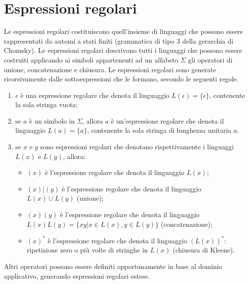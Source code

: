 \section{Espressioni regolari}
Le espressioni regolari costituiscono quell'insieme di linguaggi che possono essere rappresentati da automi a stati finiti (grammatica di tipo 3 della gerarchia di Chomsky). Le espressioni regolari descrivono tutti i linguaggi che possono essere costruiti applicando ai simboli appartenenti ad un alfabeto $\Sigma$ gli operatori di unione, concatenazione e chiusura. Le espressioni regolari sono generate ricorsivamente dalle sottoespressioni che le formano, secondo le seguenti regole.
\begin{enumerate}
\item $\epsilon$ è una espressione regolare che denota il linguaggio $L(\epsilon) = \{\epsilon\}$, 					contenente la sola stringa vuota;
\item se $a$  è un simbolo in $\Sigma$, allora $a$ è un'espressione regolare che denota il linguaggio $L(a) = 	\{a\}$, contenente la sola stringa di lunghezza unitaria $a$.
\item se $x$ e $y$ sono espressioni regolari che denotano rispettivamente i linguaggi $L(x)$ e $L(y)$, allora:
	\begin{itemize}
	\item $(x)$ è l'espressione regolare che denota il linguaggio $L(x)$;
	\item $(x) | (y)$ è l'espressione regolare che denota il linguaggio $L(x) \cup L(y)$ (unione);
	\item $(x)(y)$ è l'espressione regolare che denota il linguaggio $L(x)L(y) = \{xy | x \in L(x), y \in L(y)\}$ (concatenazione);
	\item $(x)^*$ è l'espressione regolare che denota il linguaggio $(L(x))^*$: ripetizione zero o più volte di stringhe in $L(x)$ (chiusura di Kleene).
	\end{itemize}
\end{enumerate}
Altri operatori possono essere definiti opportunamente in base al dominio applicativo, generando espressioni regolari estese.

\newpage

